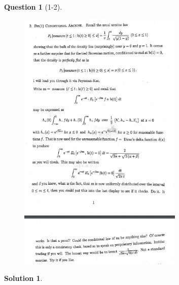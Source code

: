 \documentclass[11pt]{article}
\theoremstyle{plain}
\theoremstyle{quest}
\newtheorem*{question}{Question}
\newtheorem*{solution}{Solution}
\begin{document}
\begin{question}[1-2]
\hfill
\begin{figure}[h!]
  \centering
    \includegraphics[width=0.7\textwidth]{limthm2-f-p2.png}
\end{figure}
\end{question}
\begin{solution} \hfill \\

\end{solution}

\newpage
\end{document}
